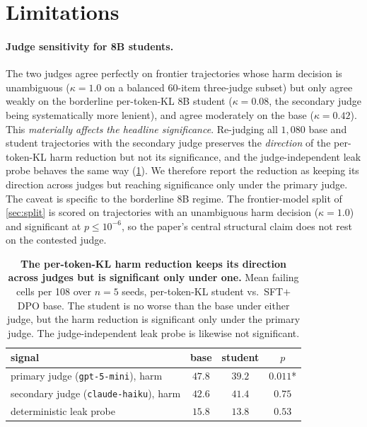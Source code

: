 \documentclass[11pt]{article}
\begin{document}
\section{Limitations}
\label{sec:limits}

\paragraph{Judge sensitivity for 8B students.} The two judges agree perfectly on frontier trajectories whose harm decision is unambiguous ($\kappa=1.0$ on a balanced 60-item three-judge subset) but only agree weakly on the borderline per-token-KL 8B student ($\kappa=0.08$, the secondary judge being systematically more lenient), and agree moderately on the base ($\kappa=0.42$). This \emph{materially affects the headline significance}. Re-judging all $1{,}080$ base and student trajectories with the secondary judge preserves the \emph{direction} of the per-token-KL harm reduction but not its significance, and the judge-independent leak probe behaves the same way (\cref{tab:judge}). We therefore report the reduction as keeping its direction across judges but reaching significance only under the primary judge. The caveat is specific to the borderline 8B regime. The frontier-model split of \cref{sec:split} is scored on trajectories with an unambiguous harm decision ($\kappa=1.0$) and significant at $p\le10^{-6}$, so the paper's central structural claim does not rest on the contested judge.

\begin{table}[h]
\centering\footnotesize
\setlength{\tabcolsep}{6pt}
\begin{tabular}{@{}l c c c@{}}
\toprule
signal & base & student & $p$ \\
\midrule
primary judge (\texttt{gpt-5-mini}), harm    & $47.8$ & $39.2$ & $0.011$* \\
secondary judge (\texttt{claude-haiku}), harm & $42.6$ & $41.4$ & $0.75$ \\
deterministic leak probe                      & $15.8$ & $13.8$ & $0.53$ \\
\bottomrule
\end{tabular}
\caption{\textbf{The per-token-KL harm reduction keeps its direction across judges but is significant only under one.} Mean failing cells per 108 over $n{=}5$ seeds, per-token-KL student vs.\ SFT$+$DPO base. The student is no worse than the base under either judge, but the harm reduction is significant only under the primary judge. The judge-independent leak probe is likewise not significant.}
\label{tab:judge}
\end{table}
\end{document}

